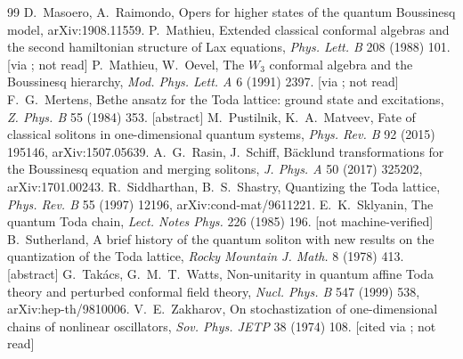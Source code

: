\documentclass[11pt,a4paper]{article}
\theoremstyle{remark}
\begin{document}
\begin{thebibliography}{99}
 D.~Masoero, A.~Raimondo, Opers for higher states of the quantum Boussinesq model, arXiv:1908.11559.
 P.~Mathieu, Extended classical conformal algebras and the second hamiltonian structure of Lax equations, \emph{Phys. Lett. B} 208 (1988) 101. [via \cite{BS}; not read]
 P.~Mathieu, W.~Oevel, The $W_3$ conformal algebra and the Boussinesq hierarchy, \emph{Mod. Phys. Lett. A} 6 (1991) 2397. [via \cite{BS}; not read]
 F.~G.~Mertens, Bethe ansatz for the Toda lattice: ground state and excitations, \emph{Z. Phys. B} 55 (1984) 353. [abstract]
 M.~Pustilnik, K.~A.~Matveev, Fate of classical solitons in one-dimensional quantum systems, \emph{Phys. Rev. B} 92 (2015) 195146, arXiv:1507.05639.
 A.~G.~Rasin, J.~Schiff, Bäcklund transformations for the Boussinesq equation and merging solitons, \emph{J. Phys. A} 50 (2017) 325202, arXiv:1701.00243.
 R.~Siddharthan, B.~S.~Shastry, Quantizing the Toda lattice, \emph{Phys. Rev. B} 55 (1997) 12196, arXiv:cond-mat/9611221.
 E.~K.~Sklyanin, The quantum Toda chain, \emph{Lect. Notes Phys.} 226 (1985) 196. [not machine-verified]
 B.~Sutherland, A brief history of the quantum soliton with new results on the quantization of the Toda lattice, \emph{Rocky Mountain J. Math.} 8 (1978) 413. [abstract]
 G.~Takács, G.~M.~T.~Watts, Non-unitarity in quantum affine Toda theory and perturbed conformal field theory, \emph{Nucl. Phys. B} 547 (1999) 538, arXiv:hep-th/9810006.
 V.~E.~Zakharov, On stochastization of one-dimensional chains of nonlinear oscillators, \emph{Sov. Phys. JETP} 38 (1974) 108. [cited via \cite{CL-WW,BD}; not read]
\end{thebibliography}
\end{document}
